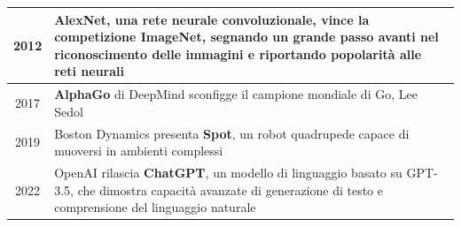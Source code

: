 \begin{center}
\begin{tabularx}{\textwidth}{c X}
		2012 &
		\textbf{AlexNet}, una rete neurale convoluzionale, vince la competizione ImageNet, segnando un grande passo avanti
		nel riconoscimento delle immagini e riportando popolarità alle reti neurali \\
		\midrule

		2017 &
		\textbf{AlphaGo} di DeepMind sconfigge il campione mondiale di Go, Lee Sedol \\
		\midrule

		2019 &
		Boston Dynamics presenta \textbf{Spot}, un robot quadrupede capace di muoversi in ambienti complessi \\
		\midrule

		2022 &
		OpenAI rilascia \textbf{ChatGPT}, un modello di linguaggio basato su GPT-3.5, che dimostra capacità avanzate di
		generazione di testo e comprensione del linguaggio naturale \\


	\end{tabularx}
\end{center}

